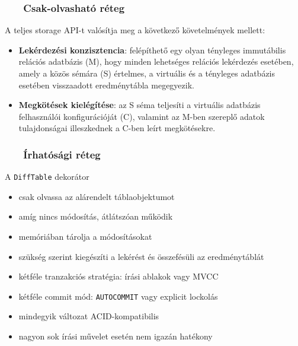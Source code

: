 \documentclass[
]{beamer}
\newcommand{\slidetitle}[2]{\frametitle{{\small #1 ~ \ding{226} ~ } \normalsize \textbf{#2} }}
\begin{document}
\begin{frame}
    \slidetitle{\sectionshorttitle}{Csak-olvasható réteg}
    
    A teljes storage API-t valósítja meg a következő követelmények mellett:
    
    \vspace{0.5cm}
    
    \begin{itemize}
        \setlength\itemsep{1.5em}
        \item \textbf{Lekérdezési konzisztencia}:
            felépíthető egy olyan tényleges immutábilis relációs adatbázis (M),
            hogy minden lehetséges relációs lekérdezés esetében,
            amely a közös sémára (S) értelmes, a virtuális és a tényleges adatbázis
            esetében visszaadott eredménytábla megegyezik.
        \item \textbf{Megkötések kielégítése}:
            az S séma teljesíti a virtuális adatbázis felhasználói konfigurációját (C),
            valamint az M-ben szereplő adatok tulajdonságai illeszkednek a C-ben leírt megkötésekre.
    \end{itemize}
\end{frame}

\begin{frame}
    \slidetitle{\sectionshorttitle}{Írhatósági réteg}
    
    {\color{beamer@blendedblue}A \texttt{DiffTable} dekorátor}
    
    \begin{itemize}
        \item csak olvassa az alárendelt táblaobjektumot
        \item amíg nincs módosítás, átlátszóan működik
        \item memóriában tárolja a módosításokat
        \item szükség szerint kiegészíti a lekérést és összefésüli az eredménytáblát
    \end{itemize}
    
    \vspace{0.4cm}
    
    
    \begin{itemize}
        \item kétféle tranzakciós stratégia: írási ablakok vagy MVCC
        \item kétféle commit mód: \texttt{AUTOCOMMIT} vagy explicit lockolás
        \item mindegyik változat ACID-kompatibilis
        \item nagyon sok írási művelet esetén nem igazán hatékony
    \end{itemize}
\end{frame}
\end{document}
